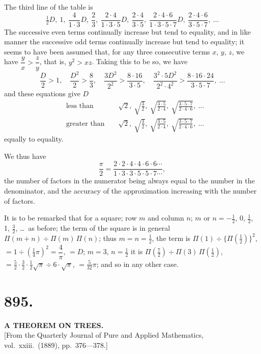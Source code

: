 \documentclass[11pt,a4paper]{article}
\begin{document}
The third line of the table is
\[
\tfrac{1}{2}D,\ 1,\ \frac{4}{1 \cdot 3}D,\ \frac{2}{3},\ \frac{2 \cdot 4}{1 \cdot 3 \cdot 5}D,\ \frac{2 \cdot 4}{3 \cdot 5},\ \frac{2 \cdot 4 \cdot 6}{1 \cdot 3 \cdot 5 \cdot 7}D,\ \frac{2 \cdot 4 \cdot 6}{3 \cdot 5 \cdot 7},\ \ldots
\]
The successive even terms continually increase but tend to equality, and in like manner the successive odd terms continually increase but tend to equality; it seems to have been assumed that, for any three consecutive terms $x$, $y$, $z$, we have $\dfrac{y}{x} > \dfrac{z}{y}$, that is, $y^2 > xz$. Taking this to be so, we have
\[
\frac{D}{2} > 1,\quad \frac{D^2}{2} > \frac{8}{3},\quad \frac{3D^2}{2^2} > \frac{8 \cdot 16}{3 \cdot 5},\quad \frac{3^2 \cdot 5 D^2}{2^2 \cdot 4^2} > \frac{8 \cdot 16 \cdot 24}{3 \cdot 5 \cdot 7},\ \ldots
\]
and these equations give $D$
\begin{align*}
&\text{less than } && \sqrt{2},\ \sqrt{\frac{3}{2}},\ \sqrt{\frac{3 \cdot 5}{2 \cdot 4}},\ \sqrt{\frac{3 \cdot 5 \cdot 7}{2 \cdot 4 \cdot 6}},\ \ldots \\
&\text{greater than } && \sqrt{2},\ \sqrt{\frac{3}{2}},\ \sqrt{\frac{3 \cdot 5}{2 \cdot 4}},\ \sqrt{\frac{3 \cdot 5 \cdot 7}{2 \cdot 4 \cdot 6}},\ \ldots
\end{align*}
equally to equality.

We thus have
\[
\frac{\pi}{2} = \frac{2 \cdot 2 \cdot 4 \cdot 4 \cdot 6 \cdot 6 \cdots}{1 \cdot 3 \cdot 3 \cdot 5 \cdot 5 \cdot 7 \cdots},
\]
the number of factors in the numerator being always equal to the number in the denominator, and the accuracy of the approximation increasing with the number of factors.

It is to be remarked that for a square; row $m$ and column $n$; $m$ or $n = -\tfrac{1}{2}$, 0, $\tfrac{1}{2}$, 1, $\tfrac{3}{2}$, \ldots\ as before; the term of the square is in general $\Pi(m+n) \div \Pi(m)\,\Pi(n)$; thus $m = n = \tfrac{1}{2}$, the term is $\Pi(1) \div \{\Pi(\tfrac{1}{2})\}^2$, $= 1 \div (\tfrac{1}{4}\pi)^2 = \dfrac{4}{\pi}$, $= D$; $m = 3$, $n = \tfrac{1}{2}$ it is $\Pi(\tfrac{7}{2}) \div \Pi(3)\,\Pi(\tfrac{1}{2})$, $= \tfrac{5}{2} \cdot \tfrac{3}{2} \cdot \tfrac{1}{2}\sqrt{\pi} \div 6 \cdot \sqrt{\pi}$, $= \tfrac{5}{32}\pi$; and so in any other case.


\section*{895.}
\begin{center}
{\large\bfseries A THEOREM ON TREES.}\\[0.5em]
\small [From the Quarterly Journal of Pure and Applied Mathematics, vol.\ xxiii.\ (1889), pp.\ 376---378.]
\end{center}
\end{document}
